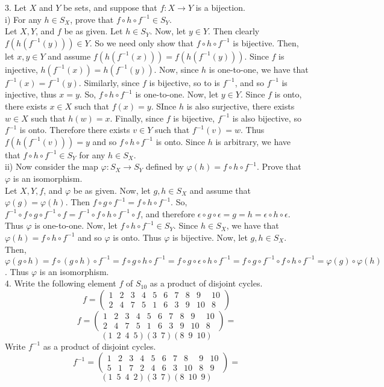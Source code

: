 \documentclass[12pt]{article}
\begin{document}
3. Let $X$ and $Y$ be sets, and suppose that $f:X\rightarrow Y$ is a bijection.\\
i) For any $h\in S_X$, prove that $f\circ h\circ f^{-1}\in S_Y$.\\
Let $X, Y$, and $f$ be as given. Let $h\in S_Y$. Now, let $y\in Y$. Then clearly $f(h(f^{-1}(y)))\in Y$. So we need only show that $f\circ h\circ f^{-1}$ is bijective. Then, let $x,y\in Y$ and assume $f(h(f^{-1}(x)))=f(h(f^{-1}(y)))$. Since $f$ is injective, $h(f^{-1}(x))=h(f^{-1}(y))$. Now, since $h$ is one-to-one, we have that $f^{-1}(x)=f^{-1}(y)$. Similarly, since $f$ is bijective, so to is $f^{-1}$, and so $f^{-1}$ is injective, thus $x=y$. So, $f\circ h\circ f^{-1}$ is one-to-one. Now, let $y\in Y$. Since $f$ is onto, there exists $x\in X$ such that $f(x)=y$. SInce $h$ is also surjective, there exists $w\in X$ such that $h(w)=x$. Finally, since $f$ is bijective, $f^{-1}$ is also bijective, so $f^{-1}$ is onto. Therefore there exists $v\in Y$ such that $f^{-1}(v)=w$. Thus $f(h(f^{-1}(v)))=y$ and so $f\circ h\circ f^{-1}$ is onto. Since $h$ is arbitrary, we have that $f\circ h\circ f^{-1}\in S_Y$ for any $h\in S_X$.\\
ii) Now consider the map $\varphi:S_X\rightarrow S_Y$ defined by $\varphi(h)=f\circ h\circ f^{-1}$. Prove that $\varphi$ is an isomorphism.\\
Let $X, Y, f$, and $\varphi$ be as given. Now, let $g,h\in S_X$ and assume that $\varphi(g)=\varphi(h)$. Then $f\circ g\circ f^{-1}=f\circ h\circ f^{-1}$. So, $f^{-1}\circ f\circ g\circ f^{-1}\circ f=f^{-1}\circ f\circ h\circ f^{-1}\circ f$, and therefore $\epsilon\circ g\circ\epsilon=g=h=\epsilon\circ h\circ\epsilon$. Thus $\varphi$ is one-to-one. Now, let $f\circ h\circ f^{-1}\in S_Y$. Since $h\in S_X$, we have that $\varphi(h)=f\circ h\circ f^{-1}$ and so $\varphi$ is onto. Thus $\varphi$ is bijective. Now, let $g,h\in S_X$. Then, $\varphi(g\circ h)=f\circ (g\circ h)\circ f^{-1}=f\circ g\circ h\circ f^{-1}=f\circ g\circ\epsilon\circ h\circ f^{-1}=f\circ g\circ f^{-1}\circ f\circ h\circ f^{-1}=\varphi(g)\circ\varphi(h)$. Thus $\varphi$ is an isomorphism.\\[20pt]

4. Write the following element $f$ of $S_{10}$ as a product of disjoint cycles.\\[5pt]
$$f=\left(\begin{array}{cccccccccc} 1 & 2 & 3 & 4 & 5 & 6 & 7 & 8 & 9 & 10\\ 2 & 4 & 7 & 5 & 1 & 6 & 3 & 9 & 10 & 8\end{array}\right)$$
$$f=\left(\begin{array}{cccccccccc} 1 & 2 & 3 & 4 & 5 & 6 & 7 & 8 & 9 & 10\\ 2 & 4 & 7 & 5 & 1 & 6 & 3 & 9 & 10 & 8\end{array}\right)=$$
$$(1\;\:2\;\:4\;\:5)(3\;\:7)(8\;\:9\;\:10)$$
Write $f^{-1}$ as a product of disjoint cycles.\\
$$f^{-1}=\left(\begin{array}{cccccccccc} 1 & 2 & 3 & 4 & 5 & 6 & 7 & 8 & 9 & 10\\ 5 & 1 & 7 & 2 & 4 & 6 & 3 & 10 & 8 & 9\end{array}\right)=$$
$$(1\;\:5\;\:4\;\:2)(3\;\:7)(8\;\:10\;\:9)$$
\end{document}

